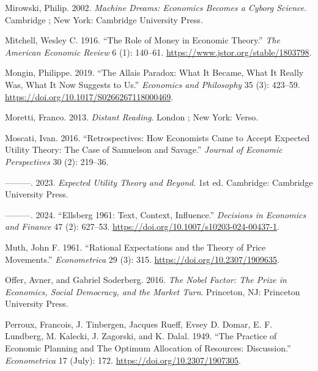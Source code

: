 \documentclass[
]{interact}
\newlength{\cslhangindent}
\newenvironment{CSLReferences}[2] %
 {\begin{list}{}{%
  \setlength{\itemindent}{0pt}
  \setlength{\leftmargin}{0pt}
  \setlength{\parsep}{0pt}
  \ifodd #1
   \setlength{\leftmargin}{\cslhangindent}
   \setlength{\itemindent}{-1\cslhangindent}
  \fi
  \setlength{\itemsep}{#2\baselineskip}}}
 {\end{list}}
\begin{document}
\begin{CSLReferences}{1}{0}
Mirowski, Philip. 2002. \emph{Machine Dreams: Economics Becomes a Cyborg
Science}. Cambridge ; New York: Cambridge University Press.

Mitchell, Wesley C. 1916. {``The {Role} of {Money} in {Economic
Theory}.''} \emph{The American Economic Review} 6 (1): 140--61.
\url{https://www.jstor.org/stable/1803798}.

Mongin, Philippe. 2019. {``The {Allais} Paradox: What It Became, What It
Really Was, What It Now Suggests to Us.''} \emph{Economics and
Philosophy} 35 (3): 423--59.
\url{https://doi.org/10.1017/S0266267118000469}.

Moretti, Franco. 2013. \emph{Distant Reading}. London ; New York: Verso.

Moscati, Ivan. 2016. {``Retrospectives: How Economists Came to Accept
Expected Utility Theory: The Case of Samuelson and Savage.''}
\emph{Journal of Economic Perspectives} 30 (2): 219--36.

---------. 2023. \emph{Expected {Utility Theory} and {Beyond}}. 1st ed.
Cambridge: Cambridge University Press.

---------. 2024. {``Ellsberg 1961: {Text}, {Context}, {Influence}.''}
\emph{Decisions in Economics and Finance} 47 (2): 627--53.
\url{https://doi.org/10.1007/s10203-024-00437-1}.

Muth, John F. 1961. {``Rational {Expectations} and the {Theory} of
{Price Movements}.''} \emph{Econometrica} 29 (3): 315.
\url{https://doi.org/10.2307/1909635}.

Offer, Avner, and Gabriel Soderberg. 2016. \emph{The {Nobel Factor}:
{The Prize} in {Economics}, {Social Democracy}, and the {Market Turn}}.
Princeton, NJ: Princeton University Press.

Perroux, Francois, J. Tinbergen, Jacques Rueff, Evsey D. Domar, E. F.
Lundberg, M. Kalecki, J. Zagorski, and K. Dalal. 1949. {``The {Practice}
of {Economic Planning} and {The Optimum Allocation} of {Resources}:
{Discussion}.''} \emph{Econometrica} 17 (July): 172.
\url{https://doi.org/10.2307/1907305}.


\end{CSLReferences}
\end{document}
